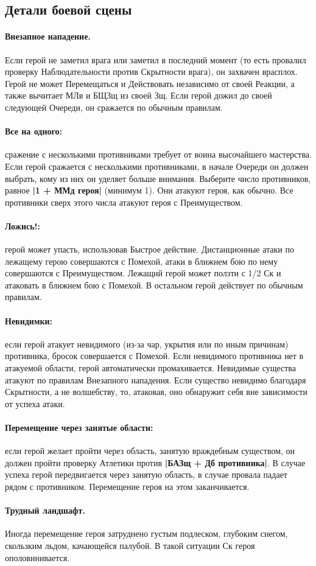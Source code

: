\subsection{Детали боевой сцены}
\paragraph{Внезапное нападение.} Если герой не заметил врага или заметил в последний момент (то есть провалил проверку Наблюдательности против Скрытности врага), он захвачен врасплох. Герой не может Перемещаться и Действовать независимо от своей Реакции, а также вычитает МЛв и БЩЗщ из своей Зщ. Если герой дожил до своей следующей Очереди, он сражается по обычным правилам.
\paragraph{Все на одного:} сражение с несколькими противниками требует от воина высочайшего мастерства. Если герой сражается с несколькими противниками, в начале Очереди он должен выбрать, кому из них он уделяет больше внимания. Выберите число противников, равное \textbf{|1 + ММд героя|} (минимум 1). Они атакуют героя, как обычно. Все противники сверх этого числа атакуют героя с Преимуществом.
\paragraph{Ложись!:} герой может упасть, использовав Быстрое действие. Дистанционные атаки по лежащему герою совершаются с Помехой, атаки в ближнем бою по нему совершаются с Преимуществом. Лежащий герой может ползти с 1/2 Ск и атаковать в ближнем бою с Помехой. В остальном герой действует по обычным правилам.
\paragraph{Невидимки:} если герой атакует невидимого (из-за чар, укрытия или по иным причинам) противника, бросок совершается с Помехой. Если невидимого противника нет в атакуемой области, герой автоматически промахивается. Невидимые существа атакуют по правилам Внезапного нападения. Если существо невидимо благодаря Скрытности, а не волшебству, то, атаковав, оно обнаружит себя вне зависимости от успеха атаки.
\paragraph{Перемещение через занятые области:} если герой желает пройти через область, занятую враждебным существом, он должен пройти проверку Атлетики против \textbf{|БАЗщ + Дб противника|}. В случае успеха герой передвигается через занятую область, в случае провала падает рядом с противником. Перемещение героя на этом заканчивается.
\paragraph{Трудный ландшафт.} Иногда перемещение героя затруднено густым подлеском, глубоким снегом, скользким льдом, качающейся палубой. В такой ситуации Ск героя ополовинивается.